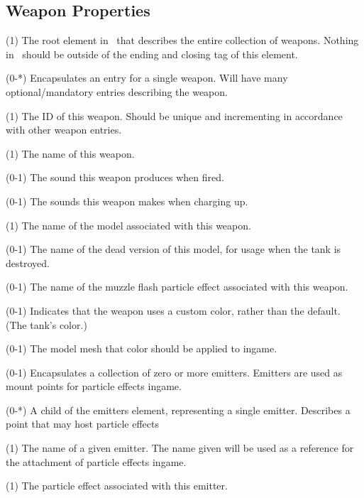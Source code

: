 \subsection{Weapon Properties}
\begin{description}
\item {} (1) The root element in \WeapProps\ that describes the entire collection of weapons.  Nothing in \WeapProps\ should be outside of the ending and closing tag of this element. 

\item {} (0-*) Encapsulates an entry for a single weapon.  Will have many optional/mandatory entries describing the weapon.

\item {} (1) The ID of this weapon.  Should be unique and incrementing in accordance with other weapon entries.

\item {} (1) The name of this weapon.

\item {} (0-1)  The sound this weapon produces when fired.

\item {} (0-1)  The sounds this weapon makes when charging up.  

\item {} (1) The name of the model associated with this weapon.

\item {} (0-1)  The name of the dead version of this model, for usage when the tank is destroyed.  

\item {} (0-1)  The name of the muzzle flash particle effect associated with this weapon.  

\item {} (0-1)  Indicates that the weapon uses a custom color, rather than the default. (The tank's color.)

\item {} (0-1)  The model mesh that color should be applied to ingame.

\item {} (0-1) Encapsulates a collection of zero or more emitters.  Emitters are used as mount points for particle effects ingame.
\item {} (0-*)  A child of the emitters element, representing a single emitter.  Describes a point that may host particle effects 
\item {} (1) The name of a given emitter.  The name given will be used as a reference for the attachment of particle effects ingame.
\item {} (1)  The particle effect associated with this emitter.


\end{description}
